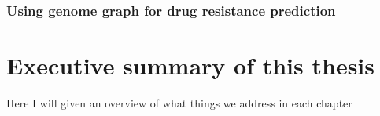 \subsubsection{Using genome graph for drug resistance prediction}
\label{sec:genome-graphs-dst}


\section{Executive summary of this thesis}

Here I will given an overview of what things we address in each chapter